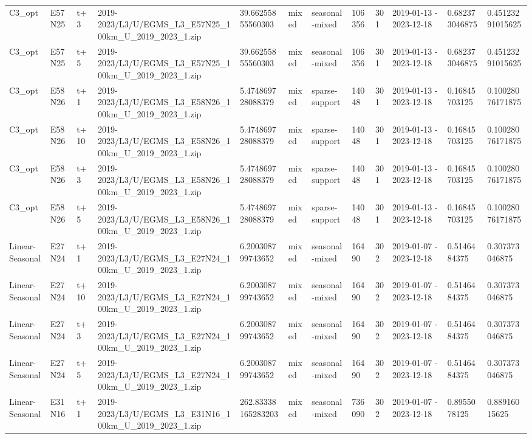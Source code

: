 \begin{landscape}
\begin{longtable}{llllllllllll}
C3\_opt & E57N25 & t+3 & 2019-2023/L3/U/EGMS\_L3\_E57N25\_100km\_U\_2019\_2023\_1.zip & 39.66255855560303 & mixed & seasonal-mixed & 106356 & 301 & 2019-01-13 - 2023-12-18 & 0.682373046875 & 0.45123291015625 \\
C3\_opt & E57N25 & t+5 & 2019-2023/L3/U/EGMS\_L3\_E57N25\_100km\_U\_2019\_2023\_1.zip & 39.66255855560303 & mixed & seasonal-mixed & 106356 & 301 & 2019-01-13 - 2023-12-18 & 0.682373046875 & 0.45123291015625 \\
C3\_opt & E58N26 & t+1 & 2019-2023/L3/U/EGMS\_L3\_E58N26\_100km\_U\_2019\_2023\_1.zip & 5.474869728088379 & mixed & sparse-support & 14048 & 301 & 2019-01-13 - 2023-12-18 & 0.16845703125 & 0.10028076171875 \\
C3\_opt & E58N26 & t+10 & 2019-2023/L3/U/EGMS\_L3\_E58N26\_100km\_U\_2019\_2023\_1.zip & 5.474869728088379 & mixed & sparse-support & 14048 & 301 & 2019-01-13 - 2023-12-18 & 0.16845703125 & 0.10028076171875 \\
C3\_opt & E58N26 & t+3 & 2019-2023/L3/U/EGMS\_L3\_E58N26\_100km\_U\_2019\_2023\_1.zip & 5.474869728088379 & mixed & sparse-support & 14048 & 301 & 2019-01-13 - 2023-12-18 & 0.16845703125 & 0.10028076171875 \\
C3\_opt & E58N26 & t+5 & 2019-2023/L3/U/EGMS\_L3\_E58N26\_100km\_U\_2019\_2023\_1.zip & 5.474869728088379 & mixed & sparse-support & 14048 & 301 & 2019-01-13 - 2023-12-18 & 0.16845703125 & 0.10028076171875 \\
Linear-Seasonal & E27N24 & t+1 & 2019-2023/L3/U/EGMS\_L3\_E27N24\_100km\_U\_2019\_2023\_1.zip & 6.200308799743652 & mixed & seasonal-mixed & 16490 & 302 & 2019-01-07 - 2023-12-18 & 0.5146484375 & 0.307373046875 \\
Linear-Seasonal & E27N24 & t+10 & 2019-2023/L3/U/EGMS\_L3\_E27N24\_100km\_U\_2019\_2023\_1.zip & 6.200308799743652 & mixed & seasonal-mixed & 16490 & 302 & 2019-01-07 - 2023-12-18 & 0.5146484375 & 0.307373046875 \\
Linear-Seasonal & E27N24 & t+3 & 2019-2023/L3/U/EGMS\_L3\_E27N24\_100km\_U\_2019\_2023\_1.zip & 6.200308799743652 & mixed & seasonal-mixed & 16490 & 302 & 2019-01-07 - 2023-12-18 & 0.5146484375 & 0.307373046875 \\
Linear-Seasonal & E27N24 & t+5 & 2019-2023/L3/U/EGMS\_L3\_E27N24\_100km\_U\_2019\_2023\_1.zip & 6.200308799743652 & mixed & seasonal-mixed & 16490 & 302 & 2019-01-07 - 2023-12-18 & 0.5146484375 & 0.307373046875 \\
Linear-Seasonal & E31N16 & t+1 & 2019-2023/L3/U/EGMS\_L3\_E31N16\_100km\_U\_2019\_2023\_1.zip & 262.83338165283203 & mixed & seasonal-mixed & 736090 & 302 & 2019-01-07 - 2023-12-18 & 0.8955078125 & 0.88916015625 \\

\end{longtable}
\end{landscape}
